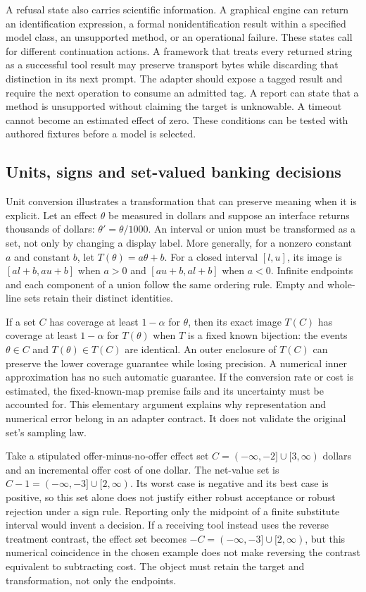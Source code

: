 A refusal state also carries scientific information. A graphical engine
can return an identification expression, a formal nonidentification result
within a specified model class, an unsupported method, or an operational
failure. These states call for different continuation actions. A framework
that treats every returned string as a successful tool result may preserve
transport bytes while discarding that distinction in its next prompt.
The adapter should expose a tagged result and require the next operation
to consume an admitted tag. A report can state that a method is unsupported
without claiming the target is unknowable. A timeout cannot become an
estimated effect of zero. These conditions can be tested with authored
fixtures before a model is selected.

\subsection{Units, signs and set-valued banking decisions}

Unit conversion illustrates a transformation that can preserve meaning
when it is explicit. Let an effect $\theta$ be measured in dollars and
suppose an interface returns thousands of dollars: $\theta'=\theta/1000$.
An interval or union must be transformed as a set, not only by changing
a display label. More generally, for a nonzero constant $a$ and constant
$b$, let $T(\theta)=a\theta+b$. For a closed interval $[l,u]$, its image
is $[al+b,au+b]$ when $a>0$ and $[au+b,al+b]$ when $a<0$. Infinite
endpoints and each component of a union follow the same ordering rule.
Empty and whole-line sets retain their distinct identities.
\citep{exec14_l6_adapter_exact}

If a set $C$ has coverage at least $1-\alpha$ for $\theta$, then its exact
image $T(C)$ has coverage at least $1-\alpha$ for $T(\theta)$ when $T$ is
a fixed known bijection: the events $\theta\in C$ and
$T(\theta)\in T(C)$ are identical. An outer enclosure of $T(C)$ can
preserve the lower coverage guarantee while losing precision. A numerical
inner approximation has no such automatic guarantee. If the conversion
rate or cost is estimated, the fixed-known-map premise fails and its
uncertainty must be accounted for. This elementary argument explains why
representation and numerical error belong in an adapter contract. It
does not validate the original set's sampling law.

Take a stipulated offer-minus-no-offer effect set
$C=(-\infty,-2]\cup[3,\infty)$ dollars and an incremental offer cost
of one dollar. The net-value set is
$C-1=(-\infty,-3]\cup[2,\infty)$. Its worst case is negative and its
best case is positive, so this set alone does not justify either robust
acceptance or robust rejection under a sign rule. Reporting only the
midpoint of a finite substitute interval would invent a decision. If a
receiving tool instead uses the reverse treatment contrast, the effect
set becomes $-C=(-\infty,-3]\cup[2,\infty)$, but this numerical
coincidence in the chosen example does not make reversing the contrast
equivalent to subtracting cost. The object must retain the target and
transformation, not only the endpoints.

